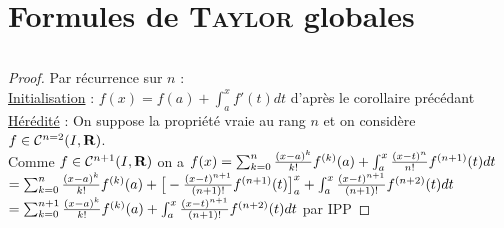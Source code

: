 	\section{Formules de \textsc{Taylor} globales}
		${}$ \\ 
		\begin{proof}
		Par récurrence sur $n$ : \\
		\underline{Initialisation} : $f(x) = f(a) + \int_a^x f'(t) dt$ d'après le corollaire précédant %
        \\
		\underline{Hérédité} : On suppose la propriété vraie au rang $n$ et on considère $f\in{\mathcal{C}}^{n=2}(I,{\mathbf{R}})$. \\ Comme $f\in{\mathcal{C}}^{n+1}(I,{\mathbf{R}})$ 
		on a $f(x) = \sum_{k= 0 }^{n} \frac{(x-a)^k}{k!}f^{(k)}(a) + \int_a^x \frac{(x-t)^n}{n!} f^{(n+1)}(t) dt $ \vspace*{0.2cm} \\ 
		$= \sum_{k= 0 }^{n} \frac{(x-a)^k}{k!}f^{(k)}(a) + \big[ -\frac{(x-t)^{n+1}}{(n+1)!}f^{(n+1)}(t) \big]_a^x + \int_a^x \frac{(x-t)^{n+1}}{(n+1)!}
		f^{(n+2)}(t) dt$ \vspace*{0.2cm} \\ $ = \sum_{k= 0 }^{n+1} \frac{(x-a)^k}{k!}f^{(k)}(a) + \int_a^x \frac{(x-t)^{n+1}}{(n+1)!} f^{(n+2)}(t) 
		dt $ par IPP
		\end{proof}
		${}$\\ 
		\vspace*{0.5cm} \\ 
		\begin{center}
		\fin
		\end{center}